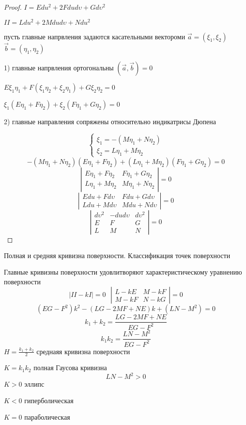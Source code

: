 \begin{proof}
  $I = Edu^2 + 2Fdud\upsilon + Gd\upsilon^2$

  $II = Ldu^2 + 2Mdud\upsilon + Ndu^2$

  пусть главные напрвления задаются касательными вектороми
  $\vec a = (\xi_1,\xi_2)$ $\vec b = (\eta_1, \eta_2)$

  1) главные напрвления ортогональны $(\vec a, \vec b) = 0$

  $E\xi_1 \eta_1 + F(\xi_1 \eta_2 + \xi_2 \eta_1) + G\xi_2 \eta_2 = 0$

  $\xi_1(E\eta_1 + F\eta_2) + \xi_2(F\eta_1 + G\eta_2) = 0$

  2) главные направления сопряжены относительно индикатрисы Дюпена

  $$
  \left\{
  \begin{array}{l}
    \xi_1 = -(M\eta_1 + N \eta_2) \\
    \xi_2 = L\eta_1 + M \eta_2
  \end{array}
  \right.
  $$
  $$
  -(M\eta_1 + N\eta_2)(E\eta_1 + F\eta_2) + (L\eta_1 + M\eta_2)(F\eta_1 +
  G\eta_2) = 0
  $$
  $$
  \left|
  \begin{array}{cc}
    E\eta_1 + F\eta_2 & F\eta_1 + G\eta_2 \\
    L\eta_1 + M\eta_2 & M\eta_1 + N\eta_2
  \end{array}
  \right| = 0
  $$
  $$
  \left|
  \begin{array}{cc}
    Edu + Fd\upsilon & Fdu + Gd\upsilon \\
    Ldu + Md\upsilon & Mdu + Nd\upsilon
  \end{array}
  \right| = 0
  $$
  $$
  \left|
  \begin{array}{ccc}
    d\upsilon^2 & -dud\upsilon & d\upsilon^2 \\
    E & F & G \\
    L & M & N
  \end{array}
  \right| = 0
  $$
\end{proof}

\begin{title}[\Large]
  Полная и средняя кривизна поверхности. Классификация точек поверхности
\end{title}

\begin{theorem}
  Главные кривизны поверхности удовлитворяют характеристическому уравнению
  поверхности
  $$
  |II - kI| = 0 ~~~
  \left|
  \begin{array}{cc}
    L - kE & M - kF \\
    M - kF & N - kG
  \end{array}
  \right| = 0
  $$
  $$
  (EG - F^2)k^2 - (LG - 2MF + NE)k + (LN - M^2) = 0
  $$
  $$
  k_1 + k_2 = \frac{LG - 2MF + NE}{EG - F^2}
  $$
  $$
  k_1 k_2 = \frac{LN - M^2}{EG - F^2}
  $$
  $H = \frac{k_1 + k_2}{2}$ среднаяя кривизна поверхности

  $K = k_1 k_2$ полная Гаусова кривизна
  $$
  LN - M^2 > 0
  $$
  $K > 0$ эллипс

  $K < 0$ гиперболическая

  $K = 0$ параболическая
\end{theorem}
